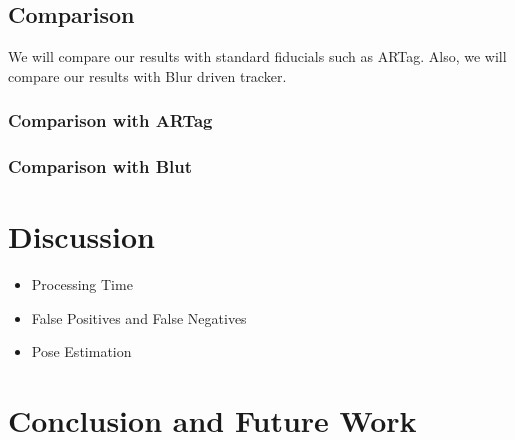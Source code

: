 \documentclass[runningheads]{llncs}
\begin{document}
\subsection{Comparison}
We will compare our results with standard fiducials such as ARTag. Also, we will
compare our results with Blur driven tracker.
\subsubsection{Comparison with ARTag}
\subsubsection{Comparison with Blut} 

\section{Discussion}
\begin{itemize}
\item Processing Time
\item False Positives and False Negatives
\item Pose Estimation
\end{itemize}
\section{Conclusion and Future Work}



\end{document}
